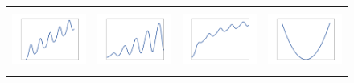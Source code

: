 \begin{subfigure}[b]{0.99\textwidth}
\begin{tabular}{cccc}
\includegraphics[height=2cm]{figs/kernel/kernelLINplusPER.png} & \includegraphics[height=2cm]{figs/kernel/kernelLINtimesPER.png} & \includegraphics[height=2cm]{figs/kernel/kernelSEplusPER.png}& \includegraphics[height=2cm]{figs/kernel/kernelLINtimesLIN.png}\\
\end{tabular}
\caption{}
\end{subfigure}

